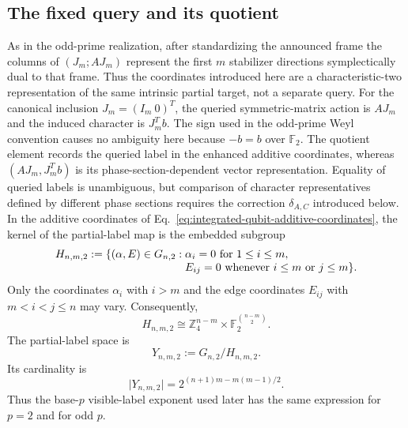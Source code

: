 \documentclass[11pt]{article}
\newcommand{\F}{\mathbb F}
\newcommand{\1}{\mathbf 1}
\theoremstyle{plain}
\theoremstyle{definition}
\theoremstyle{remark}
\begin{document}
\subsection{The fixed query and its quotient}
\label{subsec:integrated-qubit-query}
As in the odd-prime realization, after standardizing the announced frame the
columns of $(J_m;AJ_m)$ represent the first $m$ stabilizer directions
symplectically dual to that frame.  Thus the coordinates introduced here are a
characteristic-two representation of the same intrinsic partial target, not a
separate query.  For the canonical inclusion $J_m=(I_m\ 0)^T$, the queried
symmetric-matrix action is $AJ_m$ and the induced character is $J_m^Tb$.  The sign used in the odd-prime
Weyl convention causes no ambiguity here because $-b=b$ over $\F_2$.
The quotient element records the queried label in the enhanced additive
coordinates, whereas $(AJ_m,J_m^Tb)$ is its phase-section-dependent vector
representation.  Equality of queried labels is unambiguous, but comparison
of character representatives defined by different phase sections requires the
correction $\delta_{A,C}$ introduced below.
In the additive coordinates of Eq.~\eqref{eq:integrated-qubit-additive-coordinates},
the kernel of the partial-label map is the embedded subgroup
\begin{align}
 H_{n,m,2}:=\{(\alpha,E)\in G_{n,2}:{}&
 \alpha_i=0\ \text{for }1\le i\le m,\notag\\[-1mm]
 &E_{ij}=0\ \text{whenever }i\le m\text{ or }j\le m\}.
 \label{eq:integrated-qubit-unreported-subgroup}
\end{align}
Only the coordinates $\alpha_i$ with $i>m$ and the edge coordinates
$E_{ij}$ with $m<i<j\le n$ may vary.  Consequently,
\begin{equation}
 H_{n,m,2}\cong
 \mathbb Z_4^{n-m}\times\F_2^{\binom{n-m}{2}}.
 \label{eq:integrated-qubit-unreported-subgroup-isomorphism}
\end{equation}
The partial-label space is
\begin{equation}
 Y_{n,m,2}:=G_{n,2}/H_{n,m,2}.
 \label{eq:integrated-qubit-label-quotient}
\end{equation}
Its cardinality is
\begin{equation}
 \lvert Y_{n,m,2}\rvert
 =2^{(n+1)m-m(m-1)/2}.
 \label{eq:integrated-qubit-label-cardinality}
\end{equation}
Thus the base-$p$ visible-label exponent used later has the same expression for
$p=2$ and for odd $p$.
\end{document}
